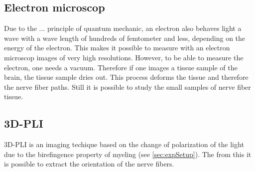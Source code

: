 \subsection{Electron microscop}
% 
Due to the ... principle of quantum mechanic, an electron also behaves light a wave with a wave length of hundreds of femtometer and less, depending on the energy of the electron.
This makes it possible to measure with an electron microscop images of very high resolutions.
However, to be able to measure the electron, one needs a vacuum.
Therefore if one images a tissue sample of the brain, the tissue sample dries out.
This process deforms the tissue and therefore the nerve fiber paths.
Still it is possible to study the small samples of nerve fiber tissue.
% 
% 
% 
\subsection{3D-PLI}
% 
\ac{3D-PLI} is an imaging techique based on the change of polarization of the light due to the birefingence property of myeling (see \cref{sec:expSetup}).
The from this it is possible to extract the orientation of the nerve fibers.
% 
% 
% 
% 
